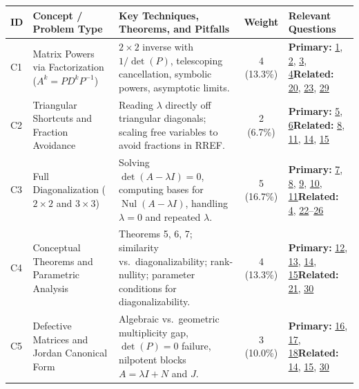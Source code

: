 \documentclass[11pt, letterpaper]{article}
\theoremstyle{definition}
\theoremstyle{remark}
\begin{document}
\renewcommand{\arraystretch}{1.5}
\begin{tabularx}{\textwidth}{l X X c p{3.1cm}}
\toprule
\textbf{ID} & \textbf{Concept / Problem Type} & \textbf{Key Techniques, Theorems, and Pitfalls} & \textbf{Weight} & \textbf{Relevant Questions} \\
\midrule
C1 & Matrix Powers via Factorization ($A^{k} = PD^{k}P^{-1}$) & $2 \times 2$ inverse with $1/\det(P)$, telescoping cancellation, symbolic powers, asymptotic limits. & 4 (13.3\%) & \textbf{Primary:} \hyperref[prob:1]{1}, \hyperref[prob:2]{2}, \hyperref[prob:3]{3}, \hyperref[prob:4]{4}\newline \textbf{Related:} \hyperref[prob:20]{20}, \hyperref[prob:23]{23}, \hyperref[prob:29]{29} \\
\addlinespace[3pt]
C2 & Triangular Shortcuts and Fraction Avoidance & Reading $\lambda$ directly off triangular diagonals; scaling free variables to avoid fractions in RREF. & 2 (6.7\%) & \textbf{Primary:} \hyperref[prob:5]{5}, \hyperref[prob:6]{6}\newline \textbf{Related:} \hyperref[prob:8]{8}, \hyperref[prob:11]{11}, \hyperref[prob:14]{14}, \hyperref[prob:15]{15} \\
\addlinespace[3pt]
C3 & Full Diagonalization ($2 \times 2$ and $3 \times 3$) & Solving $\det(A-\lambda I)=0$, computing bases for $\operatorname{Nul}(A-\lambda I)$, handling $\lambda = 0$ and repeated $\lambda$. & 5 (16.7\%) & \textbf{Primary:} \hyperref[prob:7]{7}, \hyperref[prob:8]{8}, \hyperref[prob:9]{9}, \hyperref[prob:10]{10}, \hyperref[prob:11]{11}\newline \textbf{Related:} \hyperref[prob:4]{4}, \hyperref[prob:22]{22}--\hyperref[prob:26]{26} \\
\addlinespace[3pt]
C4 & Conceptual Theorems and Parametric Analysis & Theorems 5, 6, 7; similarity vs.\ diagonalizability; rank-nullity; parameter conditions for diagonalizability. & 4 (13.3\%) & \textbf{Primary:} \hyperref[prob:12]{12}, \hyperref[prob:13]{13}, \hyperref[prob:14]{14}, \hyperref[prob:15]{15}\newline \textbf{Related:} \hyperref[prob:21]{21}, \hyperref[prob:30]{30} \\
\addlinespace[3pt]
C5 & Defective Matrices and Jordan Canonical Form & Algebraic vs.\ geometric multiplicity gap, $\det(P)=0$ failure, nilpotent blocks $A = \lambda I + N$ and $J$. & 3 (10.0\%) & \textbf{Primary:} \hyperref[prob:16]{16}, \hyperref[prob:17]{17}, \hyperref[prob:18]{18}\newline \textbf{Related:} \hyperref[prob:14]{14}, \hyperref[prob:15]{15}, \hyperref[prob:30]{30} \\

\end{tabularx}
\end{document}
